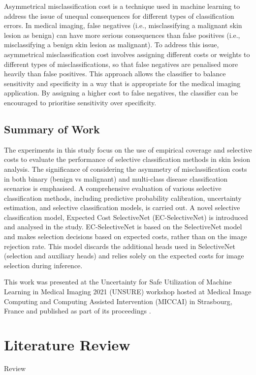 Asymmetrical misclassification cost is a technique used in machine learning to address the issue of unequal consequences for different types of classification errors. In medical imaging, false negatives (i.e., misclassifying a malignant skin lesion as benign) can have more serious consequences than false positives (i.e., misclassifying a benign skin lesion as malignant). To address this issue, asymmetrical misclassification cost involves assigning different costs or weights to different types of misclassifications, so that false negatives are penalised more heavily than false positives. This approach allows the classifier to balance sensitivity and specificity in a way that is appropriate for the medical imaging application. By assigning a higher cost to false negatives, the classifier can be encouraged to prioritise sensitivity over specificity.

\subsection{Summary of Work}
\label{subsec:selective_summary_of_work}
The experiments in this study focus on the use of empirical coverage and selective costs to evaluate the performance of selective classification methods in skin lesion analysis. The significance of considering the asymmetry of misclassification costs in both binary (benign vs malignant) and multi-class disease classification scenarios is emphasised. A comprehensive evaluation of various selective classification methods, including predictive probability calibration, uncertainty estimation, and selective classification models, is carried out. A novel selective classification model, Expected Cost SelectiveNet (EC-SelectiveNet) is introduced and analysed in the study. EC-SelectiveNet is based on the SelectiveNet model~\cite{selective2019geifman} and makes selection decisions based on expected costs, rather than on the image rejection rate. This model discards the additional heads used in SelectiveNet (selection and auxiliary heads) and relies solely on the expected costs for image selection during inference.

This work was presented at the Uncertainty for Safe Utilization of Machine Learning in Medical Imaging 2021 (UNSURE) workshop hosted at Medical Image Computing and Computing Assisted Intervention (MICCAI) in Strasbourg, France and published as part of its proceedings \citep{carse2021robust}.



\section{Literature Review}
\label{sec:selective_review}
Review



